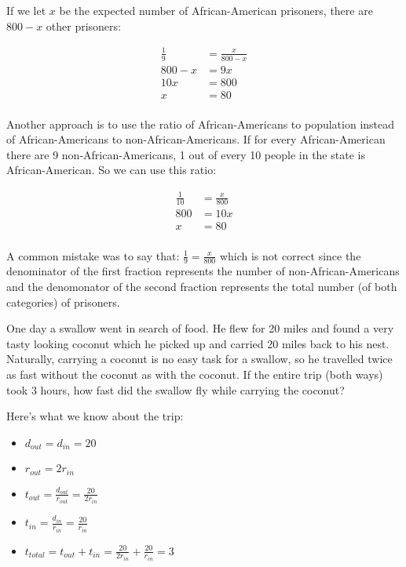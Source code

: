 \documentclass[fleqn,addpoints]{exam}
\begin{document}
\begin{questions}
\begin{solution}[7 cm]

If we let $x$ be the expected number of African-American prisoners, there are $800-x$ other prisoners:

\begin{align*}
  \frac{1}{9} &= \frac{x}{800-x} \\
  800-x &= 9x \\
  10x &= 800 \\
  x &= 80 \\
\end{align*}

Another approach is to use the ratio of African-Americans to population instead of African-Americans to
non-African-Americans.  If for every African-American there are 9 non-African-Americans, 1 out of every 10 people in the
state is African-American.  So we can use this ratio:

\begin{align*}
  \frac{1}{10} &= \frac{x}{800} \\
  800 &= 10x \\
  x &= 80 \\
\end{align*}

A common mistake was to say that: \( \displaystyle \frac{1}{9} = \frac{x}{800} \) which is not correct since the
denominator of the first fraction represents the number of non-African-Americans and the denomonator of the second
fraction represents the total number (of both categories) of prisoners.

\end{solution}

\question[10]
\label{word:last}
One day a swallow went in search of food.  He flew for 20 miles and found a very tasty looking coconut which he
picked up and carried 20 miles back to his nest.  Naturally, carrying a coconut is no easy task for a swallow, so he
travelled twice as fast without the coconut as with the coconut.  If the entire trip (both ways) took 3 hours, how fast
did the swallow fly while carrying the coconut?

\begin{solution}[5 cm]

Here's what we know about the trip:
\begin{itemize}
  \item $d_{out} = d_{in} = 20$
  \item $r_{out} = 2 r_{in}$
  \item $\displaystyle t_{out} = \frac{d_{out}}{r_{out}} = \frac{20}{2r_{in}}$
  \item $\displaystyle t_{in} = \frac{d_{in}}{r_{in}} = \frac{20}{r_{in}}$
  \item $\displaystyle t_{total} = t_{out} + t_{in} = \frac{20}{2r_{in}} + \frac{20}{r_{in}} = 3$
\end{itemize}


\end{solution}
\end{questions}
\end{document}
